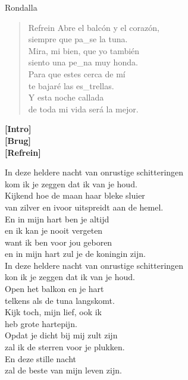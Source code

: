 \begin{song}[vals]{Rondalla}
\begin{verse}{Refrein}
Abre el balcón y el corazón,\\
siempre que pa\_se \hspace{1em}\hspace{1em} la tuna.\\
\chord{}Mira, mi bien, que yo tambi\'{e}n\\
siento una pe\_na \hspace{1em}\hspace{1em} muy honda.\\
\chord{}Para que estes cerca de m\'{i}\\
te bajar\'{e} las es\_trellas.\\
Y esta noche callada\\
de toda mi vida ser\'{a} la mejor.\hspace{4em} \\
\end{verse}

\textbf{[Intro]}\\
\textbf{[Brug]}\\
\textbf{[Refrein]}
\end{song}

\begin{translation}
In deze heldere nacht van onrustige schitteringen\\
kom ik je zeggen dat ik van je houd.\\
Kijkend hoe de maan haar bleke sluier\\
van zilver en ivoor uitspreidt aan de hemel.\\\vspace{1em}
En in mijn hart ben je altijd\\
en ik kan je nooit vergeten\\
want ik ben voor jou geboren\\
en in mijn hart zul je de koningin zijn.\\\vspace{1em}
In deze heldere nacht van onrustige schitteringen\\
kon ik je zeggen dat ik van je houd.\\\vspace{1em}
Open het balkon en je hart\\
telkens als de tuna langskomt.\\
Kijk toch, mijn lief, ook ik\\
heb grote hartepijn.\\
Opdat je dicht bij mij zult zijn\\
zal ik de sterren voor je plukken.\\
En deze stille nacht\\
zal de beste van mijn leven zijn.
\end{translation}
